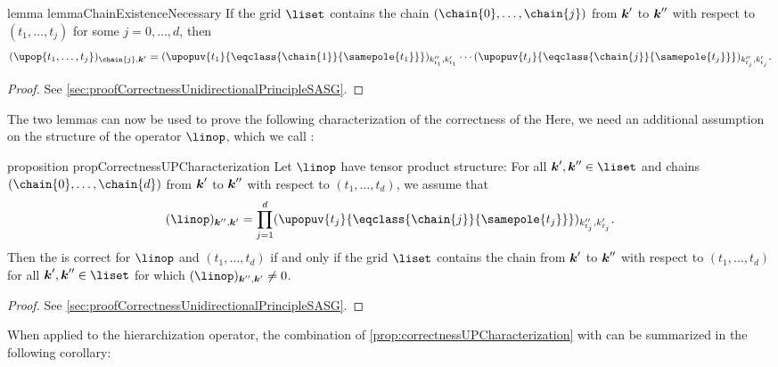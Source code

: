 \begin{restatable}{%
  lemma%
}{%
  lemmaChainExistenceNecessary%
}
  \label{lemma:chainExistenceNecessary}
  If the grid $\liset$ contains the chain $(\chain{0}, \dotsc, \chain{j})$
  from ${\boldsymbol{k}}'$ to ${\boldsymbol{k}}''$ with respect to $(t_1, \dotsc, t_j)$
  for some $j = 0, \dotsc, d$, then
  \begin{equation}
    \label{eq:lemmaChainExistenceNecessary}
    (\upop{t_1,\dotsc,t_j})_{\chain{j},\*k'}
    = (\upopuv{t_1}{\eqclass{\chain{1}}{\samepole{t_1}}})_{k''_{t_1},k'_{t_1}}
    \dotsm
    (\upopuv{t_j}{\eqclass{\chain{j}}{\samepole{t_j}}})_{k''_{t_j},k'_{t_j}}.
  \end{equation}
\end{restatable}

\begin{proof}
  See \cref{sec:proofCorrectnessUnidirectionalPrincipleSASG}.
\end{proof}

The two lemmas can now be used to prove the following characterization
of the correctness of the \up{}
Here, we need an additional assumption on the structure of the
operator $\linop$, which we call :

\begin{restatable}{%
  proposition%
}{%
  propCorrectnessUPCharacterization%
}
  \label{prop:correctnessUPCharacterization}
  Let $\linop$ have tensor product structure:
  For all $\*k', \*k'' \in \liset$ and chains
  $(\chain{0}, \dotsc, \chain{d})$ from ${\boldsymbol{k}}'$ to ${\boldsymbol{k}}''$
  with respect to $(t_1, \dotsc, t_d)$,
  we assume that
  \begin{equation}
    \label{eq:tensorProductOperator}
    (\linop)_{\*k'',\*k'}
    = \prod_{j=1}^d
    (\upopuv{t_j}{\eqclass{\chain{j}}{\samepole{t_j}}})_{k''_{t_j},k'_{t_j}}.
  \end{equation}
  Then the \up is correct for $\linop$ and $(t_1, \dotsc, t_d)$
  if and only if the grid $\liset$ contains the chain from ${\boldsymbol{k}}'$ to ${\boldsymbol{k}}''$
  with respect to $(t_1, \dotsc, t_d)$ for all $\*k', \*k'' \in \liset$
  for which $(\linop)_{\*k'',\*k'} \not= 0$.
\end{restatable}

\begin{proof}
  See \cref{sec:proofCorrectnessUnidirectionalPrincipleSASG}.
\end{proof}

When applied to the hierarchization operator,
the combination of \cref{prop:correctnessUPCharacterization} with
 can be summarized in
the following corollary:

